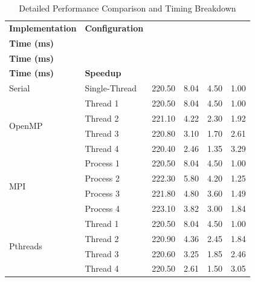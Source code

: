 \documentclass[12pt,a4paper]{article}
\begin{document}
\begin{table}[H]
\centering
\small
\setlength{\tabcolsep}{5pt}
\renewcommand{\arraystretch}{1.3}
\caption{Detailed Performance Comparison and Timing Breakdown}
\label{tab:performance_breakdown}
\begin{tabular}{|l|l|c|c|c|c|}
\hline
\textbf{Implementation} & \textbf{Configuration} & \makecell[c]{\textbf{DB Fetch}\\\textbf{Time (ms)}} & \makecell[c]{\textbf{Calculation}\\\textbf{Time (ms)}} & \makecell[c]{\textbf{Sort}\\\textbf{Time (ms)}} & \textbf{Speedup} \\ \hline
Serial & Single-Thread & 220.50 & 8.04 & 4.50 & 1.00 \\ \hline
\multirow{4}{*}{OpenMP} & Thread 1 & 220.50 & 8.04 & 4.50 & 1.00 \\ \cline{2-6}
 & Thread 2 & 221.10 & 4.22 & 2.30 & 1.92 \\ \cline{2-6}
 & Thread 3 & 220.80 & 3.10 & 1.70 & 2.61 \\ \cline{2-6}
 & Thread 4 & 220.40 & 2.46 & 1.35 & 3.29 \\ \hline
\multirow{4}{*}{MPI} & Process 1 & 220.50 & 8.04 & 4.50 & 1.00 \\ \cline{2-6}
 & Process 2 & 222.30 & 5.80 & 4.20 & 1.25 \\ \cline{2-6}
 & Process 3 & 221.80 & 4.80 & 3.60 & 1.49 \\ \cline{2-6}
 & Process 4 & 223.10 & 3.82 & 3.00 & 1.84 \\ \hline
\multirow{4}{*}{Pthreads} & Thread 1 & 220.50 & 8.04 & 4.50 & 1.00 \\ \cline{2-6}
 & Thread 2 & 220.90 & 4.36 & 2.45 & 1.84 \\ \cline{2-6}
 & Thread 3 & 220.60 & 3.25 & 1.85 & 2.46 \\ \cline{2-6}
 & Thread 4 & 220.50 & 2.61 & 1.50 & 3.05 \\ \hline
\end{tabular}
\end{table}

\clearpage
\end{document}
